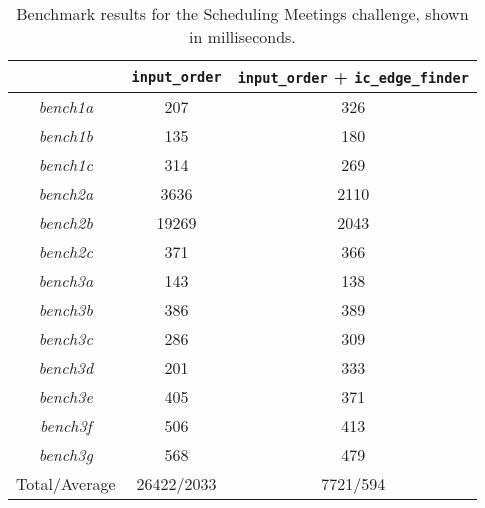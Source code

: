 \begin{table}[H]
\footnotesize
\centering
\bgroup
\def\arraystretch{1.3}
\begin{tabular}{ccc}
\multicolumn{1}{l}{} & \texttt{input\_order} & \texttt{input\_order} + \texttt{ic\_edge\_finder} \\ \hline
\textit{bench1a}  & 207 & 326 \\
\textit{bench1b}  & 135 & 180                                 \\
\textit{bench1c}  & 314   & 269                                 \\
\textit{bench2a}  & 3636   & 2110                                 \\
\textit{bench2b}  & 19269   & 2043                                 \\
\textit{bench2c}  & 371   & 366                                 \\
\textit{bench3a}  & 143   & 138                                 \\
\textit{bench3b}  & 386   & 389                                 \\
\textit{bench3c}  & 286   & 309                                 \\
\textit{bench3d}  & 201   & 333                                 \\
\textit{bench3e}  & 405   & 371                                 \\
\textit{bench3f}   & 506   & 413                                 \\
\textit{bench3g}  & 568   & 479                                 \\\hline
Total/Average     & 26422/2033   & 7721/594                       
\end{tabular}
\egroup
\caption{Benchmark results for the Scheduling Meetings challenge, shown in milliseconds.}
\label{tab:sche1}
\end{table}